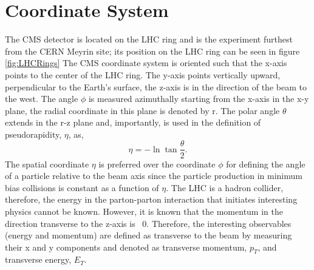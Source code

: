\section{Coordinate System}
The CMS detector is located on the LHC ring and is the experiment furthest from the
CERN Meyrin site; its position on the LHC ring can be seen in figure \ref{fig:LHCRings}
The CMS coordinate system is oriented such that the x-axis points to the center of the LHC
ring. 
The y-axis points vertically upward, perpendicular to the Earth's surface,
the z-axis is in the direction of the beam to the west. The angle $\phi$ is measured
azimuthally starting from the x-axis in the x-y plane, the radial coordinate in this plane
is denoted by r. The polar angle $\theta$ extends in the r-z plane and, importantly,
is used in the definition of pseudorapidity, $\eta$, as, 
\begin{displaymath}
\eta=-\ln{\tan\frac{\theta}{2}}.
\end{displaymath}
The spatial coordinate $\eta$ is preferred over the coordinate $\phi$ for 
defining the angle of a particle relative to the beam axis since
the particle production in minimum bias collisions is constant as a function of $\eta$.
The LHC is a hadron collider, therefore, the energy in the parton-parton interaction
that initiates interesting physics cannot be known. However, it is known that 
the momentum in the direction transverse to the z-axis is ~0. Therefore,
the interesting observables (energy and momentum) are defined as transverse
to the beam by measuring their x and y components and denoted as transverse
momentum, $p_{T}$, and transverse energy, $E_{T}$.%
%
